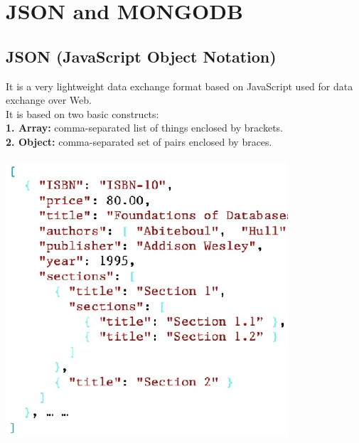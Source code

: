 \documentclass{article}
\begin{document}
\section{JSON and MONGODB}

\subsection{JSON (JavaScript Object Notation)}
It is a very lightweight data exchange format based on JavaScript used for data exchange over Web.\\
It is based on two basic constructs:\\
\textbf{1. Array: }comma-separated list of things enclosed by brackets.\\
\textbf{2. Object: }comma-separated set of pairs enclosed by braces.\\\\
\includegraphics[scale=0.5]{18.png}\\
\end{document}
